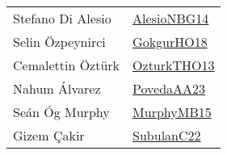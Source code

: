 {\begin{longtable}{p{4cm}p{20cm}}
Stefano {Di Alesio} & \href{papers/AlesioNBG14.pdf}{AlesioNBG14}\cite{AlesioNBG14} \\
Selin {\"{O}}zpeynirci & \href{}{GokgurHO18}\cite{GokgurHO18} \\
Cemalettin {\"{O}}zt{\"{u}}rk & \href{articles/OzturkTHO13.pdf}{OzturkTHO13}\cite{OzturkTHO13} \\
Nahum {\'{A}}lvarez & \href{papers/PovedaAA23.pdf}{PovedaAA23}\cite{PovedaAA23} \\
Se{\'{a}}n {\'{O}}g Murphy & \href{papers/MurphyMB15.pdf}{MurphyMB15}\cite{MurphyMB15} \\
Gizem {\c{C}}akir & \href{articles/SubulanC22.pdf}{SubulanC22}\cite{SubulanC22} \\
\end{longtable}
}

